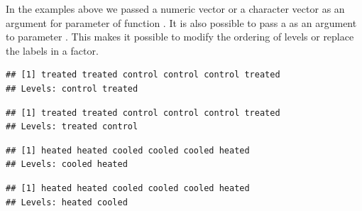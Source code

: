 \documentclass[krantz2]{krantz}\usepackage{knitr}
\begin{document}
In the examples above we passed a numeric vector or a character vector as an argument for parameter  of function . It is also possible to pass a  as an argument to parameter . This makes it possible to modify the ordering of levels or replace the labels in a factor.

\begin{knitrout}\footnotesize
{}\color{fgcolor}\begin{kframe}
\begin{alltt}
 \hlkwb{<-} \hlstd{(} 
\end{alltt}
\begin{verbatim}
## [1] treated treated control control control treated
## Levels: control treated
\end{verbatim}
\begin{alltt}
\hlstd{(}   \hlstd{=} \hlstd{(}\hlstd{,} \hlstd{))}
\end{alltt}
\begin{verbatim}
## [1] treated treated control control control treated
## Levels: treated control
\end{verbatim}
\begin{alltt}
\hlstd{(}   \hlstd{=} \hlstd{(} \hlstd{=} \hlstd{,}  \hlstd{=} \hlstd{))}
\end{alltt}
\begin{verbatim}
## [1] heated heated cooled cooled cooled heated
## Levels: cooled heated
\end{verbatim}
\begin{alltt}
\hlstd{(} 
        \hlstd{=} \hlstd{(}\hlstd{,} \hlstd{),}
        \hlstd{=} \hlstd{(}\hlstd{,} \hlstd{))}
\end{alltt}
\begin{verbatim}
## [1] heated heated cooled cooled cooled heated
## Levels: heated cooled
\end{verbatim}
\end{kframe}
\end{knitrout}
\end{document}
